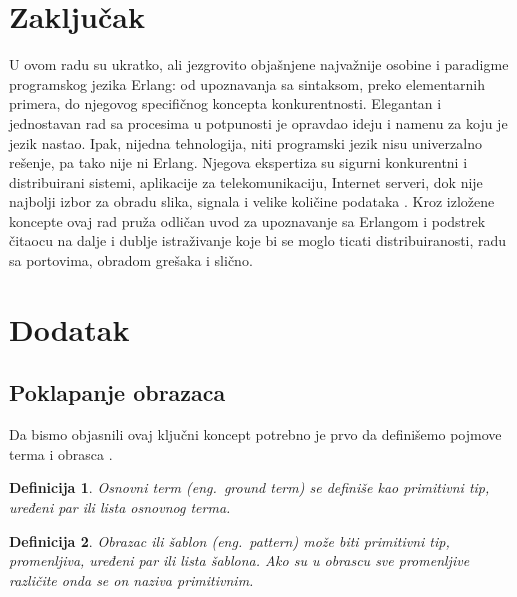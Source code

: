 \documentclass[a4paper]{article}
\newtheorem{definition}{Definicija}
\begin{document}
{\section{Zaključak}
\label{sec:zakljucak}
U ovom radu su ukratko, ali jezgrovito objašnjene najvažnije osobine i paradigme programskog jezika Erlang: 
od upoznavanja sa sintaksom, preko elementarnih primera, do njegovog specifičnog koncepta konkurentnosti. 
Elegantan i jednostavan rad sa procesima u potpunosti je opravdao ideju i namenu za koju je jezik nastao.
Ipak, nijedna tehnologija, niti programski jezik nisu univerzalno rešenje, 
pa tako nije ni Erlang. Njegova ekspertiza su sigurni konkurentni i distribuirani
sistemi, aplikacije za telekomunikaciju, 
Internet serveri, dok nije najbolji izbor za obradu slika, signala i velike količine podataka \cite{sajt}. 
Kroz izložene koncepte ovaj rad pruža odličan uvod za upoznavanje sa Erlangom 
i podstrek čitaocu na dalje i dublje istraživanje koje bi se moglo ticati distribuiranosti, radu sa portovima, obradom grešaka i slično.


\appendix
 


\newpage
\appendix
\section{Dodatak}

\subsection{Poklapanje obrazaca}
\label{sec:poklapanje_obrazaca_formalno}
Da bismo objasnili ovaj ključni koncept potrebno je prvo da definišemo pojmove terma i obrasca \cite{phdthesis}.

\theoremstyle{definition}
\begin{definition}{Osnovni term (eng.~{\em ground term})}
se definiše kao primitivni tip, uređeni par ili lista osnovnog terma.
\end{definition}

\begin{definition}{Obrazac ili šablon (eng.~{\em pattern})}
može biti primitivni tip, promenljiva, uređeni par ili lista šablona.
Ako su u obrascu sve promenljive različite onda se on naziva primitivnim.
\end{definition}

}
\end{document}
